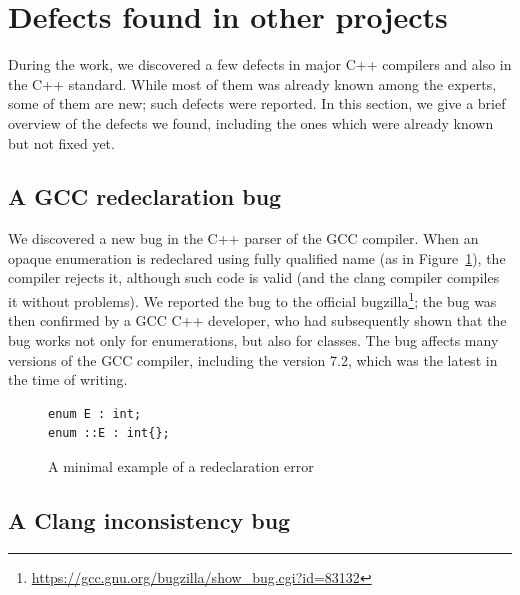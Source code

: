 \documentclass[nolot,nolof,nocover,printed]{fithesis3}
\begin{document}

\section{Defects found in other projects}\label{sec:defects}
During the work, we discovered a few defects in major C++ compilers and also in the C++ standard. While most of them was already known among the experts, some of them are new; such defects were reported.
In this section, we give a brief overview of the defects we found, including the ones which were already known but not fixed yet.

\subsection{A GCC redeclaration bug}
We discovered a new bug in the C++ parser of the GCC compiler. When an opaque enumeration is redeclared using fully qualified name (as in Figure~\ref{fig:gccRedeclarationBug}), the compiler rejects it, although such code is valid (and the clang compiler compiles it without problems).
We reported the bug to the official bugzilla\footnote{\url{https://gcc.gnu.org/bugzilla/show_bug.cgi?id=83132}}; the bug was then confirmed by a GCC C++ developer, who had subsequently shown that the bug works not only for enumerations, but also for classes. The bug affects many versions of the GCC compiler, including the version 7.2, which was the latest in the time of writing.

\begin{figure}[ht]
\begin{lstlisting}
enum E : int;
enum ::E : int{};
\end{lstlisting}
\caption{A minimal example of a redeclaration error}
\label{fig:gccRedeclarationBug}
\end{figure}

\subsection{A Clang inconsistency bug}

\end{document}

